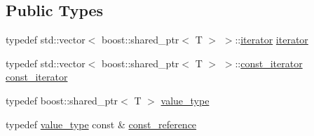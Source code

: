 \subsection*{Public Types}
\begin{DoxyCompactItemize}
\item 
typedef std::vector$<$ boost::shared\_\-ptr$<$ T $>$ $>$::\hyperlink{class_container_afe880028d8304353129f47cd1d28c20a}{iterator} \hyperlink{class_container_afe880028d8304353129f47cd1d28c20a}{iterator}
\item 
typedef std::vector$<$ boost::shared\_\-ptr$<$ T $>$ $>$::\hyperlink{class_container_a5eabadaffdd508cb623c955eb0af1518}{const\_\-iterator} \hyperlink{class_container_a5eabadaffdd508cb623c955eb0af1518}{const\_\-iterator}
\item 
typedef boost::shared\_\-ptr$<$ T $>$ \hyperlink{class_container_aa44714b9a736d2cfd2e01a87ad1c001b}{value\_\-type}
\item 
typedef \hyperlink{class_container_aa44714b9a736d2cfd2e01a87ad1c001b}{value\_\-type} const \& \hyperlink{class_container_a8dd7ae9d0687e11d873f98206e961ac1}{const\_\-reference}
\end{DoxyCompactItemize}
